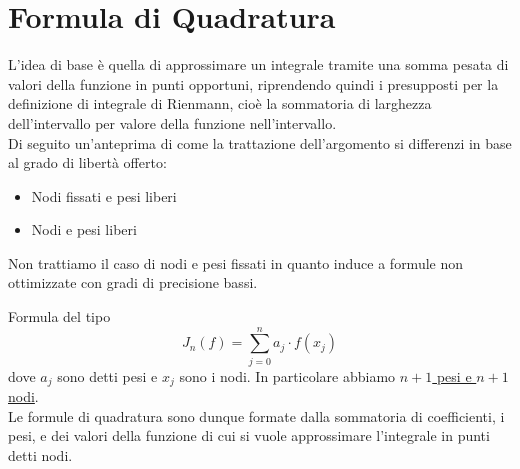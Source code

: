 \documentclass[12pt,a4paper,]{report}
\renewcommand{\arraystretch}{1.7}
\begin{document}
\section{Formula di Quadratura}
L'idea di base è quella di approssimare un integrale tramite una somma pesata di valori della funzione in punti opportuni, riprendendo quindi i presupposti per la definizione di integrale di Rienmann, cioè la sommatoria di larghezza dell'intervallo per valore della funzione nell'intervallo.\\
Di seguito un'anteprima di come la trattazione dell'argomento si differenzi in base al grado di libertà offerto:
\begin{itemize}
    \item Nodi fissati e pesi liberi
    \item Nodi e pesi liberi
\end{itemize}
\begin{nota}
    Non trattiamo il caso di nodi e pesi fissati in quanto induce a formule non ottimizzate con gradi di precisione bassi.
\end{nota}
\begin{definizione}
    Formula del tipo
    \[
    J_n(f) = \sum_{j=0}^n a_j \cdot f(x_j)
    \]
    dove $a_j$ sono detti pesi e $x_j$ sono i nodi.
    In particolare abbiamo \uline{$n+1$ pesi e $n+1$ nodi}.\\
    Le formule di quadratura sono dunque formate dalla sommatoria di coefficienti, i pesi, e dei valori della funzione di cui si vuole approssimare l'integrale in punti detti nodi.
\end{definizione}
\end{document}
